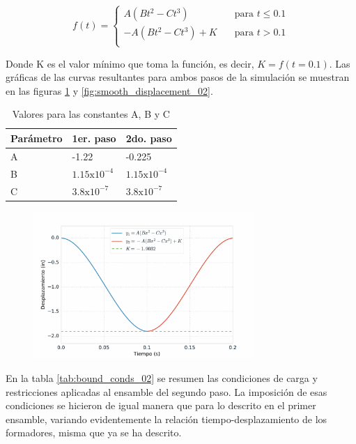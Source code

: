 \begin{equation}
f(t) = \left\{\begin{matrix}
A(Bt^2 - Ct^3) \,\,\,\,\,\, &  \text{para} \,\, t \leq 0.1 \\
-A(Bt^2 - Ct^3) + K \,\,\,\,\,\,& \text{para} \,\, t > 0.1 \\
\end{matrix}\right.
\end{equation}

Donde K es el valor mínimo que toma la función, es decir, $K = f(t=0.1)$. Las gráficas de 
las curvas resultantes para ambos pasos de la simulación se muestran en las figuras 
\ref{fig:smooth_displacement_01} y \ref{fig:smooth_displacement_02}.

\begin{table}[H]
\centering
\caption{Valores para las constantes A, B y C}
\label{}
\begin{tabular}{p{3cm} p{2cm} p{2cm}} \hline
Parámetro & 1er. paso & 2do. paso \\
\hline
A & -1.22 & -0.225 \\
B & $1.15\text{x}10^{-4}$ & $1.15\text{x}10^{-4}$ \\
C & $3.8\text{x}10^{-7}$ & $3.8\text{x}10^{-7}$ \\
\hline
\end{tabular}
\label{tab:smooth_step_constants}
\end{table}

\begin{figure}[H]
\centering
\includegraphics[width=0.75\textwidth]{src/ch3/smooth_displacement_01.pdf}
\label{fig:smooth_displacement_01}
\end{figure}

En la tabla \ref{tab:bound_conds_02} se resumen las condiciones de carga y restricciones aplicadas 
al ensamble del segundo paso. La imposición de esas condiciones se hicieron de igual manera que para 
lo descrito en el primer ensamble, variando evidentemente la relación tiempo-desplazamiento de los 
formadores, misma que ya se ha descrito.

